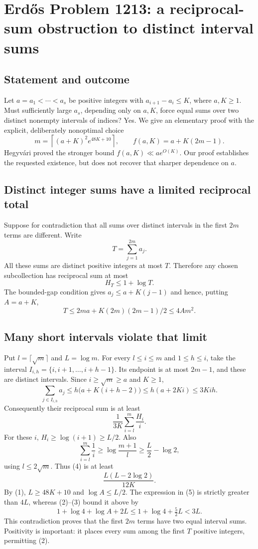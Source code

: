 \section*{Erd\H{o}s Problem 1213: a reciprocal-sum obstruction to distinct interval sums}
\subsection*{Statement and outcome}
Let $a=a_1<\cdots<a_s$ be positive integers with $a_{i+1}-a_i\le K$, where $a,K\ge1$. Must sufficiently large $a_s$, depending only on $a,K$, force equal sums over two distinct nonempty intervals of indices? Yes. We give an elementary proof with the explicit, deliberately nonoptimal choice
\[
 m=\left\lceil(a+K)^2e^{48K+10}\right\rceil,\qquad
 f(a,K)=a+K(2m-1).
 \tag{1}
\]
Hegyv\'ari proved the stronger bound $f(a,K)\ll ae^{O(K)}$. Our proof establishes the requested existence, but does not recover that sharper dependence on $a$.

\subsection*{Distinct integer sums have a limited reciprocal total}
Suppose for contradiction that all sums over distinct intervals in the first $2m$ terms are different. Write
\[
 T=\sum_{j=1}^{2m}a_j.
\]
All these sums are distinct positive integers at most $T$. Therefore any chosen subcollection has reciprocal sum at most
\[
 H_T\le1+\log T.
 \tag{2}
\]
The bounded-gap condition gives $a_j\le a+K(j-1)$ and hence, putting $A=a+K$,
\[
 T\le2ma+K(2m)(2m-1)/2\le4Am^2.
 \tag{3}
\]

\subsection*{Many short intervals violate that limit}
Put $l=\lceil\sqrt m\rceil$ and $L=\log m$. For every $l\le i\le m$ and $1\le h\le i$, take the interval
$I_{i,h}=\{i,i+1,\ldots,i+h-1\}$. Its endpoint is at most $2m-1$, and these are distinct intervals. Since $i\ge\sqrt m\ge a$ and $K\ge1$,
\[
 \sum_{j\in I_{i,h}}a_j
 \le h\bigl(a+K(i+h-2)\bigr)
 \le h(a+2Ki)\le3Kih.
\]
Consequently their reciprocal sum is at least
\[
 \frac1{3K}\sum_{i=l}^{m}\frac{H_i}{i}.
 \tag{4}
\]
For these $i$, $H_i\ge\log(i+1)\ge L/2$. Also
\[
 \sum_{i=l}^{m}\frac1i
 \ge\log\frac{m+1}{l}\ge\frac L2-\log2,
\]
using $l\le2\sqrt m$. Thus (4) is at least
\[
 \frac{L(L-2\log2)}{12K}.
 \tag{5}
\]
By (1), $L\ge48K+10$ and $\log A\le L/2$. The expression in (5) is strictly greater than $4L$, whereas (2)--(3) bound it above by
\[
 1+\log4+\log A+2L\le1+\log4+\tfrac52L<3L.
\]
This contradiction proves that the first $2m$ terms have two equal interval sums. Positivity is important: it places every sum among the first $T$ positive integers, permitting (2).

